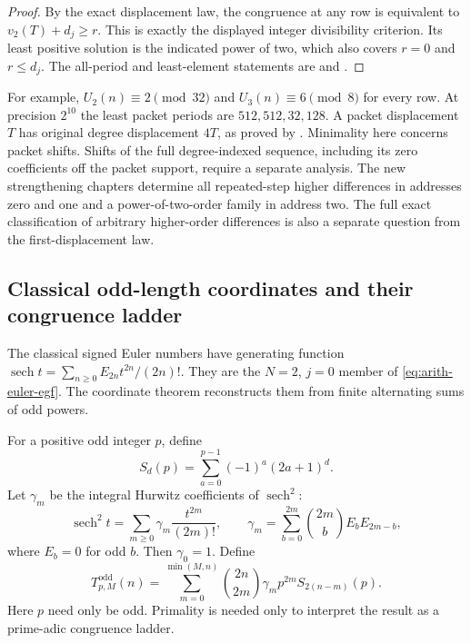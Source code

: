 \begin{proof}
By the exact displacement law, the congruence at any row is equivalent to
$v_2(T)+d_j\ge r$.  This is exactly the displayed integer
divisibility criterion.  Its least positive solution is the indicated
power of two, which also covers $r=0$ and $r\le d_j$.
The all-period and least-element statements are
 and
.
\end{proof}

For example, $U_2(n)\equiv2\pmod{32}$ and $U_3(n)\equiv6\pmod8$
for every row.  At precision $2^{10}$ the least packet periods are
$512,512,32,128$.  A packet displacement $T$ has original degree
displacement $4T$, as proved by
.
Minimality here concerns packet shifts.  Shifts of the full degree-indexed
sequence, including its zero coefficients off the packet support, require
a separate analysis.  The new strengthening chapters determine all repeated-step higher differences in addresses zero and one and a power-of-two-order family in address two. The full exact classification of arbitrary higher-order differences
is also a separate question from the first-displacement law.

\subsection{Classical odd-length coordinates and their congruence ladder}

The classical signed Euler numbers have generating function
$\operatorname{sech}t=\sum_{n\ge0}E_{2n}t^{2n}/(2n)!$.
They are the $N=2$, $j=0$ member of
\eqref{eq:arith-euler-egf}.  The coordinate theorem reconstructs
them from finite alternating sums of odd powers.

\begin{definition}
\label{def:arith-odd-source}
For a positive odd integer $p$, define
\[
 S_d(p)=\sum_{a=0}^{p-1}(-1)^a(2a+1)^d.
\]
Let $\gamma_m$ be the integral Hurwitz coefficients of $\operatorname{sech}^2$:
\[
 \operatorname{sech}^2t=\sum_{m\ge0}\gamma_m\frac{t^{2m}}{(2m)!},
 \qquad
 \gamma_m=\sum_{b=0}^{2m}\binom{2m}{b}E_bE_{2m-b},
\]
where $E_b=0$ for odd $b$.  Then $\gamma_0=1$.  Define
\[
 T^{\mathrm{odd}}_{p,M}(n)=\sum_{m=0}^{\min(M,n)}
       \binom{2n}{2m}\gamma_m p^{2m}S_{2(n-m)}(p).
\]
Here $p$ need only be odd. Primality is needed only to interpret the
result as a prime-adic congruence ladder.
\end{definition}

